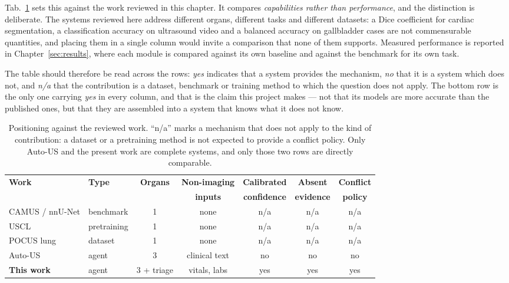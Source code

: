 Tab.~\ref{tab:positioning} sets this against the work reviewed in this chapter. It compares
\emph{capabilities rather than performance}, and the distinction is deliberate. The systems
reviewed here address different organs, different tasks and different datasets: a Dice
coefficient for cardiac segmentation, a classification accuracy on ultrasound video and a
balanced accuracy on gallbladder cases are not commensurable quantities, and placing them in
a single column would invite a comparison that none of them supports. Measured performance
is reported in Chapter~\ref{sec:results}, where each module is compared against its own
baseline and against the benchmark for its own task.

The table should therefore be read across the rows: \emph{yes} indicates that a system
provides the mechanism, \emph{no} that it is a system which does not, and \emph{n/a} that
the contribution is a dataset, benchmark or training method to which the question does not
apply. The bottom row is the only one carrying \emph{yes} in every column, and that is the
claim this project makes --- not that its models are more accurate than the published ones,
but that they are assembled into a system that knows what it does not know.

\begin{table}[H]
  \centering
  \small
  \setlength{\tabcolsep}{4pt}
  \begin{tabular}{llccccc}
    \toprule
    \textbf{Work} & \textbf{Type} & \textbf{Organs} & \textbf{Non-imaging} &
    \textbf{Calibrated} & \textbf{Absent} & \textbf{Conflict} \\
    & & & \textbf{inputs} & \textbf{confidence} & \textbf{evidence} & \textbf{policy} \\
    \midrule
    CAMUS / nnU-Net \cite{leclerc2019camus, isensee2021nnunet}
      & benchmark   & 1 & none & n/a & n/a & n/a \\
    USCL \cite{chen2021uscl}
      & pretraining & 1 & none & n/a & n/a & n/a \\
    POCUS lung \cite{born2021pocus}
      & dataset     & 1 & none & n/a & n/a & n/a \\
    Auto-US \cite{yang2025autous}
      & agent       & 3 & clinical text & no & no & no \\
    \addlinespace[3pt]
    \textbf{This work}
      & agent       & 3 + triage & vitals, labs & yes & yes & yes \\
    \bottomrule
  \end{tabular}
  \caption{Positioning against the reviewed work. ``n/a'' marks a mechanism that does not
    apply to the kind of contribution: a dataset or a pretraining method is not expected to
    provide a conflict policy. Only Auto-US and the present work are complete systems, and
    only those two rows are directly comparable.}
  \label{tab:positioning}
\end{table}

